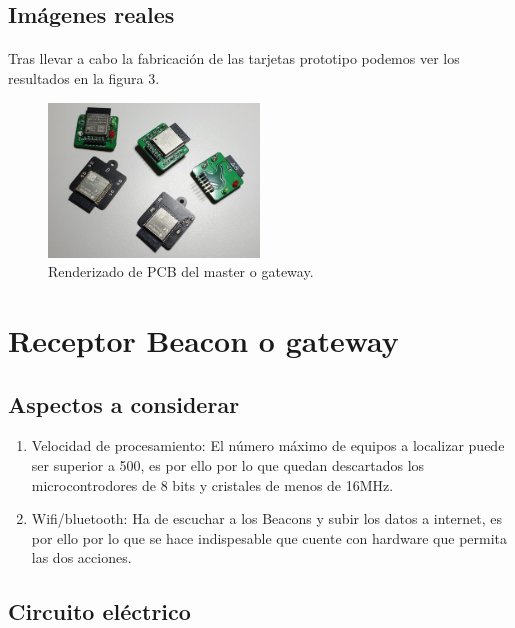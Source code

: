 \documentclass[paper=a4, fontsize=11pt,twoside]{scrartcl}	%
\begin{document}
    \subsection{Imágenes reales}
        \paragraph{}
        Tras llevar a cabo la fabricación de las tarjetas prototipo podemos ver los resultados en la figura 3.
        \begin{center}
            \begin{figure}[ht]
                \centering
                \includegraphics[width=0.5\textwidth]{../real_beacon_pcb.jpeg}
                \caption{Renderizado de PCB del master o gateway.}
                \label{fig:mesh3}
            \end{figure}    
        \end{center}       
\section{Receptor Beacon o gateway}
    \subsection{Aspectos a considerar}
        \begin{enumerate}
            \item Velocidad de procesamiento: El número máximo de equipos a localizar puede ser superior a 500, es por ello 
            por lo que quedan descartados los microcontrodores de 8 bits y cristales de menos de 16MHz.
            \item Wifi/bluetooth: Ha de escuchar a los Beacons y subir los datos a internet, es por ello por lo que se hace 
            indispesable que cuente con hardware que permita las dos acciones.
        \end{enumerate}

    \subsection{Circuito eléctrico}
\end{document}
